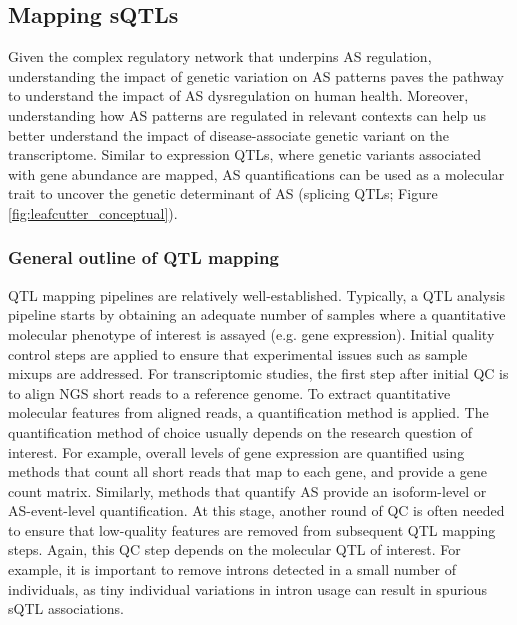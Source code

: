 \subsection{Mapping sQTLs}

Given the complex regulatory network that underpins AS regulation, understanding the impact of genetic variation on AS patterns paves the pathway to understand the impact of AS dysregulation on human health. Moreover, understanding how AS patterns are regulated in relevant contexts can help us better understand the impact of disease-associate genetic variant on the transcriptome. Similar to expression QTLs, where genetic variants associated with gene abundance are mapped, AS quantifications can be used as a molecular trait to uncover the genetic determinant of AS (splicing QTLs; Figure \ref{fig:leafcutter_conceptual}).\\

\subsubsection{General outline of QTL mapping}
QTL mapping pipelines are relatively well-established. Typically, a QTL analysis pipeline starts by obtaining an adequate number of samples where a quantitative molecular phenotype of interest is assayed (e.g. gene expression). Initial quality control steps are applied to ensure that experimental issues such as sample mixups are addressed. For transcriptomic studies, the first step after initial QC is to align NGS short reads to a reference genome. To extract quantitative molecular features from aligned reads, a quantification method is applied. The quantification method of choice usually depends on the research question of interest. For example, overall levels of gene expression are quantified using methods that count all short reads that map to each gene, and provide a gene count matrix. Similarly, methods that quantify AS provide an isoform-level or AS-event-level quantification. At this stage, another round of QC is often needed to ensure that low-quality features are removed from subsequent QTL mapping steps. Again, this QC step depends on the molecular QTL of interest. For example, it is important to remove introns detected in a small number of individuals, as tiny individual variations in intron usage can result in spurious sQTL associations. \\

